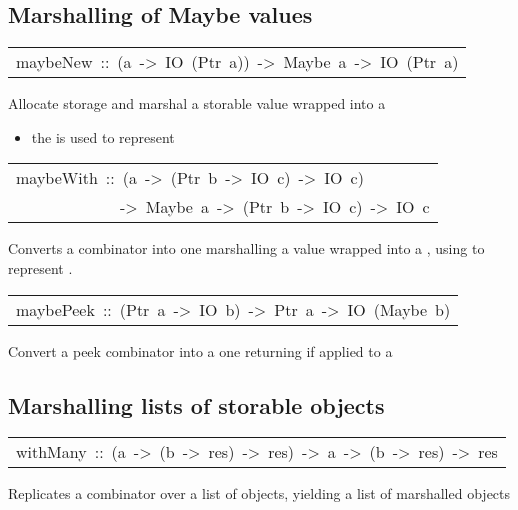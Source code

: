 \subsection{Marshalling of Maybe values
}
\begin{haddockdesc}
\item[\begin{tabular}{@{}l}
maybeNew\ ::\ (a\ ->\ IO\ (Ptr\ a))\ ->\ Maybe\ a\ ->\ IO\ (Ptr\ a)
\end{tabular}]\haddockbegindoc
Allocate storage and marshal a storable value wrapped into a 
\par
\begin{itemize}
\item
 the  is used to represent 
\par

\end{itemize}

\end{haddockdesc}
\begin{haddockdesc}
\item[\begin{tabular}{@{}l}
maybeWith\ ::\ (a\ ->\ (Ptr\ b\ ->\ IO\ c)\ ->\ IO\ c)\\\ \ \ \ \ \ \ \ \ \ \ \ \ ->\ Maybe\ a\ ->\ (Ptr\ b\ ->\ IO\ c)\ ->\ IO\ c
\end{tabular}]\haddockbegindoc
Converts a  combinator into one marshalling a value wrapped
 into a , using  to represent .
\par

\end{haddockdesc}
\begin{haddockdesc}
\item[\begin{tabular}{@{}l}
maybePeek\ ::\ (Ptr\ a\ ->\ IO\ b)\ ->\ Ptr\ a\ ->\ IO\ (Maybe\ b)
\end{tabular}]\haddockbegindoc
Convert a peek combinator into a one returning  if applied to a
\par

\end{haddockdesc}
\subsection{Marshalling lists of storable objects
}
\begin{haddockdesc}
\item[\begin{tabular}{@{}l}
withMany\ ::\ (a\ ->\ (b\ ->\ res)\ ->\ res)\ ->\ {\char 91}a{\char 93}\ ->\ ({\char 91}b{\char 93}\ ->\ res)\ ->\ res
\end{tabular}]\haddockbegindoc
Replicates a  combinator over a list of objects, yielding a list of
 marshalled objects
\par

\end{haddockdesc}
